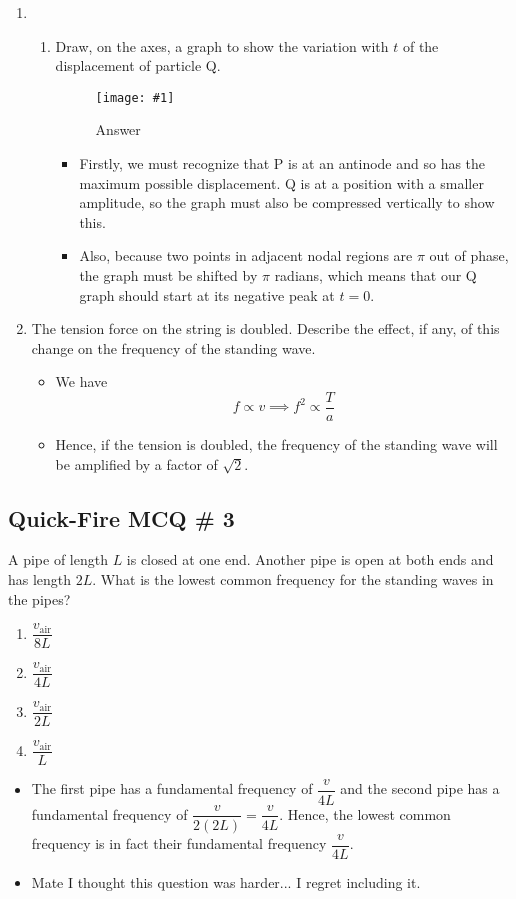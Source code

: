 \documentclass[a4paper,12pt]{article}
\newcommand{\img}[4]{\begin{center}
  \begin{figure}[H]
    \centering
    \texttt{[image: \#1]}
    \caption{#3}
    \label{fig:#4}
  \end{figure}
\end{center}}
\begin{document}
\begin{enumerate}[label=(\alph*)]
  \item \begin{enumerate}[label=(\roman*)]
          \item Draw, on the axes, a graph to show the variation with $t$ of the displacement of particle Q.
                \img{ex/6.png}{0.6}{Answer}{string}
                \begin{itemize}
                  \item Firstly, we must recognize that P is at an antinode and so has the maximum possible displacement. Q is at a position with a smaller amplitude, so the graph must also be compressed vertically to show this.
                  \item Also, because two points in adjacent nodal regions are $\pi$ out of phase, the graph must be shifted by $\pi$ radians, which means that our Q graph should start at its negative peak at $t = 0$.
                \end{itemize}
        \end{enumerate}
  \item The tension force on the string is doubled. Describe the effect, if any, of this change on the frequency of the standing wave.
        \begin{itemize}
          \item We have
                $$f \propto v \implies f^2 \propto \frac{T}{a} $$
          \item Hence, if the tension is doubled, the frequency of the standing wave will be amplified by a factor of $\sqrt{2}$.
        \end{itemize}
\end{enumerate}

\pagebreak

\subsection{Quick-Fire MCQ \# 3}

A pipe of length $L$ is closed at one end. Another pipe is open at both ends and has length $2L$. What is the lowest common frequency for the standing waves in the pipes?

\begin{enumerate}[label=\Alph*. ]
  \item $\dfrac{v_\text{air}}{8L}$
  \item $\dfrac{v_\text{air}}{4L}$
  \item $\dfrac{v_\text{air}}{2L}$
  \item $\dfrac{v_\text{air}}{L}$
\end{enumerate}

\begin{itemize}
  \item The first pipe has a fundamental frequency of $\dfrac{v}{4L}$ and the second pipe has a fundamental frequency of $\dfrac{v}{2(2L)} = \dfrac{v}{4L}$. Hence, the lowest common frequency is in fact their fundamental frequency $\dfrac{v}{4L}$.
  \item Mate I thought this question was harder... I regret including it.
\end{itemize}
\end{document}
